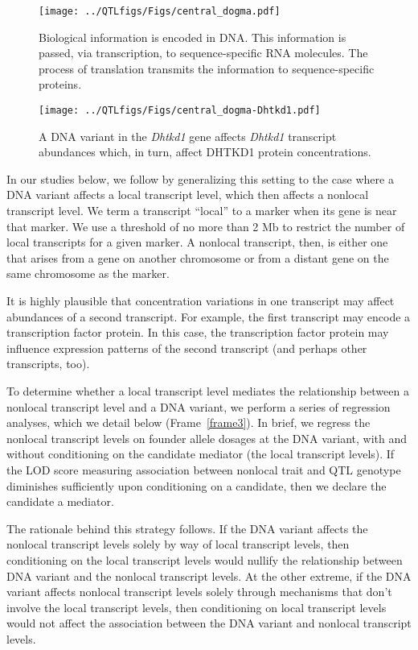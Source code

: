 \documentclass[oneside]{book}\usepackage[]{graphicx}\usepackage[]{color}
\begin{document}
\begin{titlepage}
\begin{figure}
  \centering
  \texttt{[image: ../QTLfigs/Figs/central\_dogma.pdf]}
  \caption{Biological information is encoded in DNA. This information is passed, via transcription, to sequence-specific RNA molecules. The process of translation transmits the information to sequence-specific proteins.}\label{fig:dogma}
\end{figure}


\begin{figure}
  \centering
  \texttt{[image: ../QTLfigs/Figs/central\_dogma-Dhtkd1.pdf]}
  \caption{A DNA variant in the \emph{Dhtkd1} gene affects \emph{Dhtkd1} transcript abundances which, in turn, affect DHTKD1 protein concentrations.}\label{fig:Dhtkd1}
\end{figure}


In our studies below, we follow \citet{keller2018genetic} by generalizing this setting to
the case where a DNA variant affects a local transcript level, which then affects a
nonlocal transcript level.
We term a transcript ``local'' to a marker when its gene is near that marker.
We use a threshold of no more than 2 Mb to restrict the
number of local transcripts for a given marker.
A nonlocal transcript, then, is either one that arises from a gene on another chromosome or
from a distant gene on the same chromosome as the marker.

It is highly plausible that concentration variations in one transcript may
affect abundances of a second transcript.
For example, the first transcript may encode a transcription factor protein.
In this case, the transcription factor protein may influence expression
patterns of the second transcript (and perhaps other transcripts, too).


To determine whether a local transcript level mediates the relationship between
a nonlocal transcript level and a DNA variant, we perform a series of regression analyses,
which we detail below (Frame~\ref{frame3}).
In brief, we regress the nonlocal transcript levels on founder allele dosages at the DNA
variant, with and without conditioning on the candidate mediator (the local transcript levels).
If the LOD score measuring association between nonlocal trait and QTL genotype diminishes
sufficiently upon conditioning on a candidate,
then we declare the candidate a mediator.

The rationale behind this strategy follows.
If the DNA variant affects the nonlocal transcript levels solely by way of local
transcript levels, then conditioning on the local transcript levels would nullify the
relationship between DNA variant and the nonlocal transcript levels.
At the other extreme, if the DNA variant affects nonlocal transcript levels solely
through mechanisms that don't involve the local transcript levels, then conditioning
on local transcript levels would not affect the association between the DNA variant and
nonlocal transcript levels.



\end{titlepage}
\end{document}
